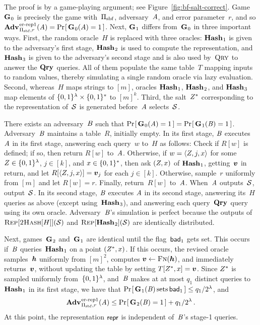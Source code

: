 {The proof is by a game-playing argument; see Figure~\ref{fig:bf-salt-correct}.
%
Game~$\textup{\textbf{G}}\hspace{0.5pt}_0$ is precisely the \errepone game with~$\mathrm{\Pi}_{\mathrm{sbf}}$,
adversary~$\mathit{A}$, and error parameter~$r$, and so
$\Adv{\errepone}_{\struct_\saltybloom,r}(\advA) = \Prob{\game_0(\advA)=1}$.
%
Next, $\textup{\textbf{G}}\hspace{0.5pt}_1$ differs from~$\textup{\textbf{G}}\hspace{0.5pt}_0$ in three important ways.
%
First, the random oracle~$H$ is replaced with three oracles: $\textup{\textbf{Hash}}\hspace{0.5pt}_1$ is
given to the adversary's first stage, $\textup{\textbf{Hash}}\hspace{0.5pt}_2$ is used to compute the
representation, and $\textup{\textbf{Hash}}\hspace{0.5pt}_3$ is given to the adversary's second stage and
is also used by~$\textnormal{\textsc{Qry}}$ to answer the $\textup{\textbf{Qry}}\hspace{0.5pt}$ queries.  All of them
populate the same table~$T$ mapping inputs to random values, thereby simulating
a single random oracle via lazy evaluation.
%
Second, whereas~$H$ maps strings to $[m]$, oracles $\textup{\textbf{Hash}}\hspace{0.5pt}_1$,
$\textup{\textbf{Hash}}\hspace{0.5pt}_2$, and $\textup{\textbf{Hash}}\hspace{0.5pt}_3$ map elements of $\{0,1\}^\lambda \times
\{0,1\}^*$ to $[m]^k$.
%
Third, the salt~$Z^*$ corresponding to the representation of~$\mathcal{S}$
is generated before~$\mathit{A}$ selects~$\mathcal{S}$.

There exists an adversary~$\mathit{B}$ such that $\Pr\hspace{-1pt}\left[\,\textup{\textbf{G}}\hspace{0.5pt}_0(\mathit{A})=1\,\right] =
\Pr\hspace{-1pt}\left[\,\textup{\textbf{G}}\hspace{0.5pt}_1(\mathit{B})=1\,\right]$.
%
Adversary~$\mathit{B}$ maintains a table~$R$, initially empty.
%
In its first stage, $\mathit{B}$ executes~$\mathit{A}$ in its first stage, answering each
query~$w$ to~$H$ as follows:
%
Check if $R[w]$ is defined; if so, then return $R[w]$ to~$\mathit{A}$.
%
Otherwise, if $w = \str(\salt, j, x)$ for some $Z \in \{0,1\}^\lambda$, $j \in
[k]$, and $x \in \{0,1\}^*$, then ask $(Z, x)$ of $\textup{\textbf{Hash}}\hspace{0.5pt}_1$, getting~$\boldsymbol{v}$ in
return, and let $R[\str(\salt,j,x)] = \vv_j$ for each $j\in[k]$.
%
Otherwise, sample~$r$ uniformly from $[m]$ and let $R[w] = r$.
%
Finally, return~$R[w]$ to~$\mathit{A}$.
%
When~$\mathit{A}$ outputs~$\mathcal{S}$, output~$\mathcal{S}$.
%
In its second stage, $\mathit{B}$ executes $\mathit{A}$ in its second stage, answering
its~$H$ queries as above (except using~$\textup{\textbf{Hash}}\hspace{0.5pt}_3$), and answering each
query~$\textup{\textbf{Qry}}\hspace{0.5pt}$ query using its own oracle.
%
Adversary~$\mathit{B}$'s simulation is perfect because the outputs of
$\textnormal{\textsc{Rep}}[\textnormal{\textsc{2Hash}}[H]](\mathcal{S})$ and $\textnormal{\textsc{Rep}}[\textup{\textbf{Hash}}\hspace{0.5pt}_2](\mathcal{S})$ are
identically distributed.

Next, games~$\textup{\textbf{G}}\hspace{0.5pt}_2$ and~$\textup{\textbf{G}}\hspace{0.5pt}_1$ are identical until the flag~$\mathsf{bad}_1$ gets set.
This occurs if~$\mathit{B}$ queries~$\textup{\textbf{Hash}}\hspace{0.5pt}_1$ on a point $(Z^*,x)$. If this
occurs, the revised oracle samples~$\boldsymbol{h}$ uniformly from $[m]^2$, computes $\boldsymbol{v}
\gets \textnormal{\textsc{Fn}}(\boldsymbol{h})$, and immediately returns~$\boldsymbol{v}$, without updating the table by
setting $T[Z^*, x] = \boldsymbol{v}$.
%
Since $Z^*$ is sampled uniformly from~$\{0,1\}^\lambda$, and~$\mathit{B}$ makes at
at most $q_1$ distinct queries to~$\textup{\textbf{Hash}}\hspace{0.5pt}_1$ in its first stage, we have
that $\Pr\hspace{-1pt}\left[\,\textup{\textbf{G}}\hspace{0.5pt}_1(\mathit{B}) \,\mathrm{sets}\, \mathsf{bad}_1\,\right] \leq q_1/2^{\lambda}$, and
\begin{equation*}
\Adv{\errepone}_{\struct_\saltybloom,r}(\advA) \leq \Prob{\game_2(\advB)=1} + q_1/2^{\lambda} \,.
\end{equation*}
At this point, the representation $\mathsf{repr}$ is independent of~$\mathit{B}$'s stage-1
queries.

}
